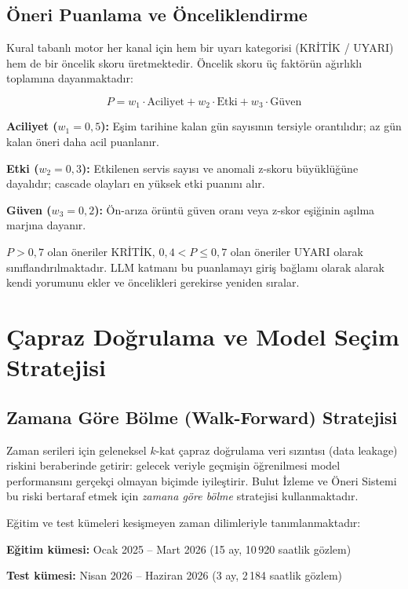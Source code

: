 \subsection{Öneri Puanlama ve Önceliklendirme}

Kural tabanlı motor her kanal için hem bir uyarı kategorisi (KRİTİK / UYARI) hem de bir öncelik skoru üretmektedir.
Öncelik skoru üç faktörün ağırlıklı toplamına dayanmaktadır:

\begin{equation}
    P = w_1 \cdot \text{Aciliyet} + w_2 \cdot \text{Etki} + w_3 \cdot \text{Güven}
    \label{eq:oncelik}
\end{equation}

\begin{maddelendir}[label=--]
    \item \textbf{Aciliyet ($w_1 = 0{,}5$):} Eşim tarihine kalan gün sayısının tersiyle orantılıdır; az gün kalan öneri daha acil puanlanır.
    \item \textbf{Etki ($w_2 = 0{,}3$):} Etkilenen servis sayısı ve anomali z-skoru büyüklüğüne dayalıdır; cascade olayları en yüksek etki puanını alır.
    \item \textbf{Güven ($w_3 = 0{,}2$):} Ön-arıza örüntü güven oranı veya z-skor eşiğinin aşılma marjına dayanır.
\end{maddelendir}

$P > 0{,}7$ olan öneriler KRİTİK, $0{,}4 < P \leq 0{,}7$ olan öneriler UYARI olarak sınıflandırılmaktadır.
LLM katmanı bu puanlamayı giriş bağlamı olarak alarak kendi yorumunu ekler ve öncelikleri gerekirse yeniden sıralar.


\section{Çapraz Doğrulama ve Model Seçim Stratejisi}
\label{sec:modelseçim}

\subsection{Zamana Göre Bölme (Walk-Forward) Stratejisi}

Zaman serileri için geleneksel $k$-kat çapraz doğrulama veri sızıntısı (data leakage) riskini beraberinde getirir: gelecek veriyle geçmişin öğrenilmesi model performansını gerçekçi olmayan biçimde iyileştirir.
Bulut İzleme ve Öneri Sistemi bu riski bertaraf etmek için \textit{zamana göre bölme} stratejisi kullanmaktadır.

Eğitim ve test kümeleri kesişmeyen zaman dilimleriyle tanımlanmaktadır:
\begin{maddelendir}[label=--]
    \item \textbf{Eğitim kümesi:} Ocak 2025 -- Mart 2026 (15 ay, 10\,920 saatlik gözlem)
    \item \textbf{Test kümesi:} Nisan 2026 -- Haziran 2026 (3 ay, 2\,184 saatlik gözlem)
\end{maddelendir}

